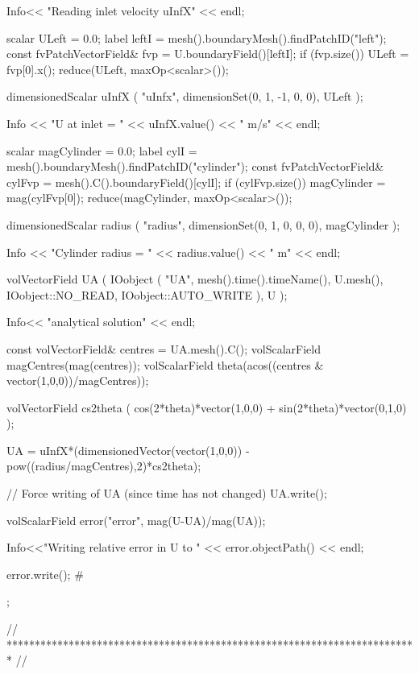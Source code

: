 \begin{OFverbatim}
{{{            Info<< "Reading inlet velocity  uInfX\n" << endl;

            scalar ULeft = 0.0;
            label leftI = mesh().boundaryMesh().findPatchID("left");
            const fvPatchVectorField& fvp = U.boundaryField()[leftI];
            if (fvp.size())
            {
                ULeft = fvp[0].x();
            }
            reduce(ULeft, maxOp<scalar>());

            dimensionedScalar uInfX
            (
                "uInfx",
                dimensionSet(0, 1, -1, 0, 0),
                ULeft
            );

            Info << "U at inlet = " << uInfX.value() << " m/s" << endl;


            scalar magCylinder = 0.0;
            label cylI = mesh().boundaryMesh().findPatchID("cylinder");
            const fvPatchVectorField& cylFvp = mesh().C().boundaryField()[cylI];
            if (cylFvp.size())
            {
                magCylinder = mag(cylFvp[0]);
            }
            reduce(magCylinder, maxOp<scalar>());

            dimensionedScalar radius
            (
                "radius",
                dimensionSet(0, 1, 0, 0, 0),
                magCylinder
            );

            Info << "Cylinder radius = " << radius.value() << " m" << endl;

            volVectorField UA
            (
                IOobject
                (
                    "UA",
                    mesh().time().timeName(),
                    U.mesh(),
                    IOobject::NO_READ,
                    IOobject::AUTO_WRITE
                ),
                U
            );

            Info<< "\nEvaluating analytical solution" << endl;

            const volVectorField& centres = UA.mesh().C();
            volScalarField magCentres(mag(centres));
            volScalarField theta(acos((centres & vector(1,0,0))/magCentres));

            volVectorField cs2theta
            (
                cos(2*theta)*vector(1,0,0)
              + sin(2*theta)*vector(0,1,0)
            );

            UA = uInfX*(dimensionedVector(vector(1,0,0))
              - pow((radius/magCentres),2)*cs2theta);

            // Force writing of UA (since time has not changed)
            UA.write();

            volScalarField error("error", mag(U-UA)/mag(UA));

            Info<<"Writing relative error in U to " << error.objectPath()
                << endl;

            error.write();
        #};
    }
}


// ************************************************************************* //
\end{OFverbatim}
